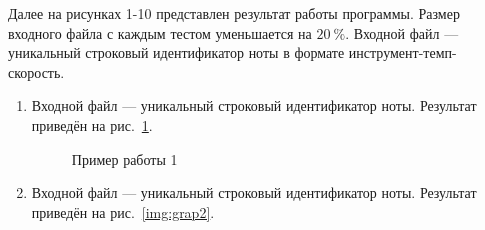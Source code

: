 \documentclass[12pt, a4paper]{article}
\begin{document}
Далее на рисунках 1-10 представлен результат работы программы. Размер входного 
файла с каждым тестом уменьшается на $20~\%$.
Входной файл --- уникальный строковый идентификатор ноты в формате 
инструмент-темп-скорость.  
\begin{enumerate}
	\item Входной файл --- уникальный строковый идентификатор ноты.
	Результат приведён на рис.~\ref{img:grap1}.
	\begin{figure}[h]
  		\caption{Пример работы 1}
  		\label{img:grap1}
	\end{figure}
	\newpage
	\item Входной файл --- уникальный строковый идентификатор ноты.
	Результат приведён на рис.~\ref{img:grap2}.
	\begin{figure}[h]

\end{figure}
\end{enumerate}
\end{document}
